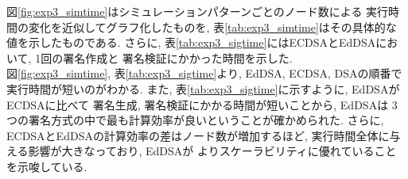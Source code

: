 \indent 図\ref{fig:exp3_simtime}はシミュレーションパターンごとのノード数による
実行時間の変化を近似してグラフ化したものを, 表\ref{tab:exp3_simtime}はその具体的な
値を示したものである. さらに, 表\ref{tab:exp3_sigtime}にはECDSAとEdDSAにおいて, 1回の署名作成と
署名検証にかかった時間を示した. \\
\indent 図\ref{fig:exp3_simtime}, 表\ref{tab:exp3_sigtime}より, 
EdDSA, ECDSA, DSAの順番で実行時間が短いのがわかる. また, 
表\ref{tab:exp3_sigtime}に示すように, EdDSAがECDSAに比べて
署名生成, 署名検証にかかる時間が短いことから, EdDSAは
3つの署名方式の中で最も計算効率が良いということが確かめられた. 
さらに, ECDSAとEdDSAの計算効率の差はノード数が増加するほど, 
実行時間全体に与える影響が大きなっており, EdDSAが
よりスケーラビリティに優れていることを示唆している. 